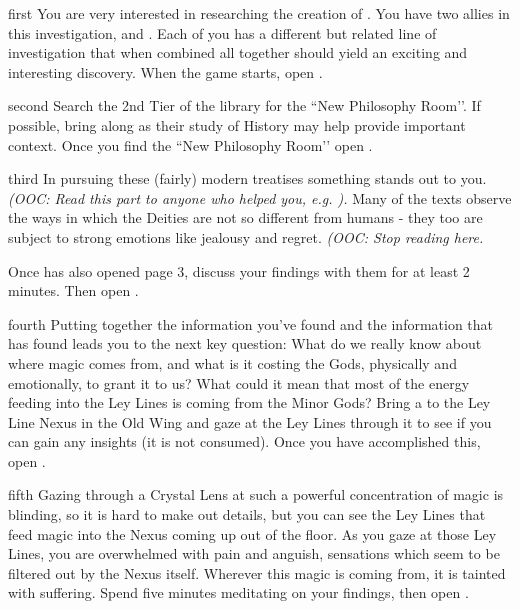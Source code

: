 \documentclass[notebook]{GL2020} %
\begin{document}
\startnotebook{\nCreationTwo{}}

\begin{page}{first}
You are very interested in researching the creation of \pEarth{}. You have two allies in this investigation, \cEbbPriest{} and \cScholarship{}. Each of you has a different but related line of investigation that when combined all together should yield an exciting and interesting discovery. When the game starts, open .
\end{page}

\begin{page}{second}
Search the 2nd Tier of the library for the ``New Philosophy Room’’. If possible, bring \cHistory{} along as their study of History may help provide important context. Once you find the ``New Philosophy Room’’ open .
\end{page}

\begin{page}{third}
In pursuing these (fairly) modern treatises something stands out to you. \emph{(OOC: Read this part to anyone who helped you, e.g. \cHistory{}).} Many of the texts observe the ways in which the Deities are not so different from humans - they too are subject to strong emotions like jealousy and regret. \emph{(OOC: Stop reading here.}

Once \textbf{\cScholarship{}} has also opened page 3, discuss your findings with them for at least 2 minutes. Then open .
\end{page}

\begin{page}{fourth}
Putting together the information you’ve found and the information that \cScholarship{} has found leads you to the next key question: What do we really know about where magic comes from, and what is it costing the Gods, physically and emotionally, to grant it to us? What could it mean that most of the energy feeding into the Ley Lines is coming from the Minor Gods? Bring a \iCrystalLens{} to the Ley Line Nexus in the Old Wing and gaze at the Ley Lines through it to see if you can gain any insights (it is not consumed). Once you have accomplished this, open .
\end{page}

\begin{page}{fifth}
Gazing through a Crystal Lens at such a powerful concentration of magic is blinding, so it is hard to make out details, but you can see the Ley Lines that feed magic into the Nexus coming up out of the floor. As you gaze at those Ley Lines, you are overwhelmed with pain and anguish, sensations which seem to be filtered out by the Nexus itself. Wherever this magic is coming from, it is tainted with suffering. Spend five minutes meditating on your findings, then open .
\end{page}
\end{document}
